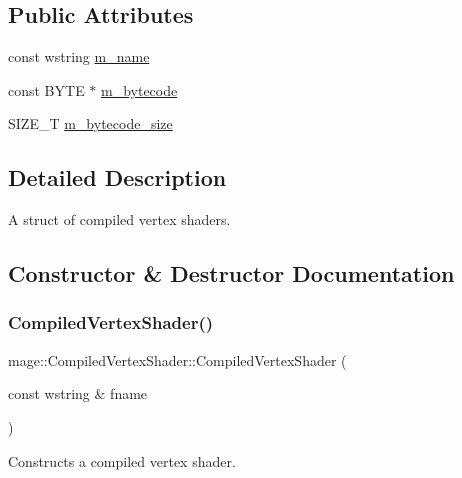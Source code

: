 \subsection*{Public Attributes}
\begin{DoxyCompactItemize}
\item 
const wstring \hyperlink{structmage_1_1_compiled_vertex_shader_af37c5f63c4146dd796c7e4df5ade4d0e}{m\+\_\+name}
\item 
const B\+Y\+TE $\ast$ \hyperlink{structmage_1_1_compiled_vertex_shader_aa561d0238dcf7b76674bc530269b5539}{m\+\_\+bytecode}
\item 
S\+I\+Z\+E\+\_\+T \hyperlink{structmage_1_1_compiled_vertex_shader_ad0f3b47bc42daed6377cfff63cf2f808}{m\+\_\+bytecode\+\_\+size}
\end{DoxyCompactItemize}


\subsection{Detailed Description}
A struct of compiled vertex shaders. 

\subsection{Constructor \& Destructor Documentation}
\hypertarget{structmage_1_1_compiled_vertex_shader_a6d7c45d00130a68ee11beb1840d2756e}{}\label{structmage_1_1_compiled_vertex_shader_a6d7c45d00130a68ee11beb1840d2756e} 
\subsubsection{\texorpdfstring{Compiled\+Vertex\+Shader()}{CompiledVertexShader()}\hspace{0.1cm}{\footnotesize\ttfamily [1/4]}}
{\footnotesize\ttfamily mage\+::\+Compiled\+Vertex\+Shader\+::\+Compiled\+Vertex\+Shader (\begin{DoxyParamCaption}\item[{const wstring \&}]{fname }\end{DoxyParamCaption})\hspace{0.3cm}{\ttfamily [explicit]}}

Constructs a compiled vertex shader.


